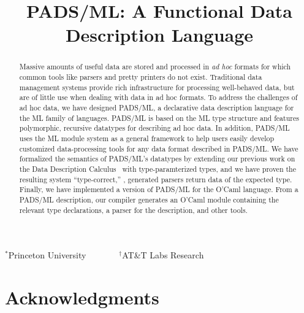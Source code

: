 \documentclass[nocopyrightspace]{sigplanconf}
\begin{document}
\title{PADS/ML: A Functional Data Description Language}
{$^\ast$Princeton University \ \ \ \ \ \ \ $^\dagger$AT\&T Labs Research}
 { \ \ \ \ }



\maketitle{}

\begin{abstract}  

  Massive amounts of useful data are stored and processed in
  \textit{ad hoc} formats for which common tools like parsers and
  pretty printers do not exist.  Traditional data management 
  systems provide rich infrastructure for processing well-behaved
  data, but are of little use when dealing with data in ad hoc
  formats.  To address the challenges of ad hoc data, we have designed
  PADS/ML, a declarative data description language for the ML family
  of languages.  PADS/ML is based on the ML type structure and
  features polymorphic, recursive datatypes for describing ad hoc
  data.  In addition, PADS/ML uses the ML module system as a general
  framework to help users easily develop customized data-processing
  tools for any data format described in PADS/ML.  We have formalized the
  semantics of PADS/ML's datatypes by extending our previous work on
  the Data Description Calculus~\cite{fisher+:next700ddl} with
  type-paramterized types, and we have proven the resulting system
  ``type-correct,'' \ie{}, generated parsers return data of the
  expected type.  Finally, we have implemented a version of PADS/ML
  for the O'Caml language.  From a PADS/ML description, our compiler
  generates an O'Caml module containing the relevant type
  declarations, a parser for the description, and other tools.

\end{abstract}















\section*{Acknowledgments}




%


\end{document}
